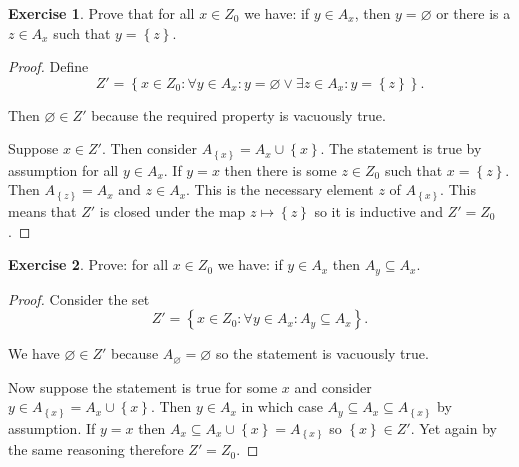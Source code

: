 \documentclass{article}
\theoremstyle{definition}
\newtheorem{question}{Exercise}
\newcommand{\set}[1]{\left\{#1\right\}}
\newcommand{\setwith}[2]{\set{#1\colon#2}}
\begin{document}
\begin{question}
    Prove that for all \(x\in Z_{0}\) we have: if \(y\in A_{x}\), then
    \(y=\varnothing\) or there is a \(z\in A_{x}\) such that \(y=\set{z}\).

    \begin{proof}
        Define
        \[
            Z'=\setwith{x\in Z_{0}}{\forall y\in A_{x}:y=\varnothing\vee\exists z\in A_{x}:y=\set{z}}.
        \]

        Then \(\varnothing\in Z'\) because the required property is vacuously
        true.

        Suppose \(x\in Z'\). Then consider \(A_{\set{x}}=A_{x}\cup\set{x}\). The
        statement is true by assumption for all \(y\in A_{x}\). If \(y=x\) then
        there is some \(z\in Z_{0}\) such that \(x=\set{z}\). Then
        \(A_{\set{z}}=A_{x}\) and \(z\in A_{x}\). This is the necessary element
        \(z\) of \(A_{\set{x}}\). This means that \(Z'\) is closed under the map
        \(z\mapsto\set{z}\) so it is inductive and \(Z'=Z_{0}\).
    \end{proof}
\end{question}

\begin{question}
    Prove: for all \(x\in Z_{0}\) we have: if \(y\in A_{x}\) then
    \(A_{y}\subseteq A_{x}\).

    \begin{proof}
        Consider the set
        \[
            Z'=\setwith{x\in Z_{0}}{\forall y\in A_{x}:A_{y}\subseteq A_{x}}.
        \]

        We have \(\varnothing\in Z'\) because \(A_{\varnothing}=\varnothing\) so
        the statement is vacuously true.

        Now suppose the statement is true for some \(x\) and consider \(y\in
        A_{\set{x}}=A_{x}\cup\set{x}\). Then \(y\in A_{x}\) in which case
        \(A_{y}\subseteq A_{x}\subseteq A_{\set{x}}\) by assumption. If \(y=x\)
        then \(A_{x}\subseteq A_{x}\cup\set{x}=A_{\set{x}}\) so \(\set{x}\in
        Z'\). Yet again by the same reasoning therefore \(Z'=Z_{0}\).
    \end{proof}
\end{question}
\end{document}
